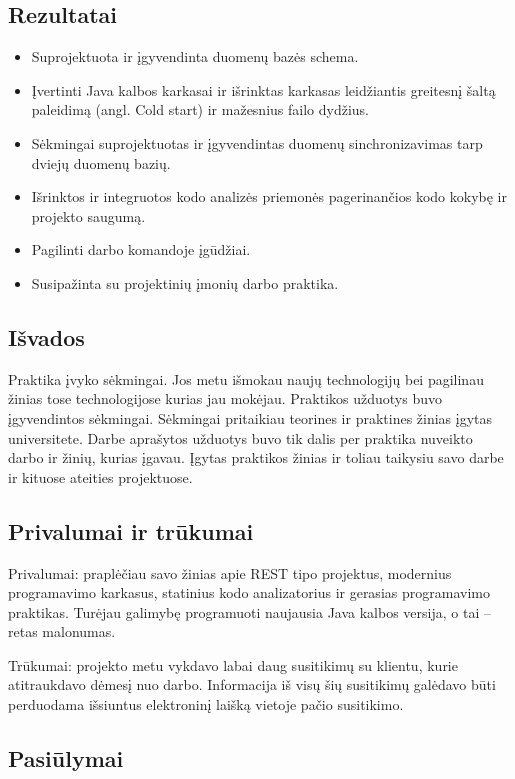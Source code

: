 \documentclass{VUMIFPSkursinis}
\begin{document}
	\subsection{Rezultatai}
		\begin{itemize}
			\item{Suprojektuota ir įgyvendinta duomenų bazės schema.}
			\item{Įvertinti Java kalbos karkasai ir išrinktas karkasas leidžiantis greitesnį šaltą paleidimą (angl. Cold start) ir mažesnius failo dydžius.}
			\item{Sėkmingai suprojektuotas ir įgyvendintas duomenų sinchronizavimas tarp dviejų duomenų bazių.}
			\item{Išrinktos ir integruotos kodo analizės priemonės pagerinančios kodo kokybę ir projekto saugumą.}
			\item{Pagilinti darbo komandoje įgūdžiai.}
			\item{Susipažinta su projektinių įmonių darbo praktika.}
		\end{itemize}
		
	\subsection{Išvados}
		Praktika įvyko sėkmingai. Jos metu išmokau naujų technologijų bei pagilinau žinias tose technologijose kurias jau mokėjau. 
		Praktikos užduotys buvo įgyvendintos sėkmingai. Sėkmingai pritaikiau teorines ir praktines žinias įgytas universitete.
		Darbe aprašytos užduotys buvo tik dalis per praktika nuveikto darbo ir žinių, kurias įgavau.
		Įgytas praktikos žinias ir toliau taikysiu savo darbe ir kituose ateities projektuose.
		
	\subsection{Privalumai ir trūkumai}
		Privalumai: praplėčiau savo žinias apie REST tipo projektus, modernius programavimo karkasus, statinius kodo analizatorius ir gerasias programavimo
		praktikas. Turėjau galimybę programuoti naujausia Java kalbos versija, o tai – retas malonumas.  

		Trūkumai: projekto metu vykdavo labai daug susitikimų su klientu, kurie atitraukdavo dėmesį nuo darbo. Informacija iš visų šių susitikimų galėdavo būti perduodama išsiuntus elektroninį laišką vietoje pačio susitikimo.

	\subsection{Pasiūlymai}
\end{document}
